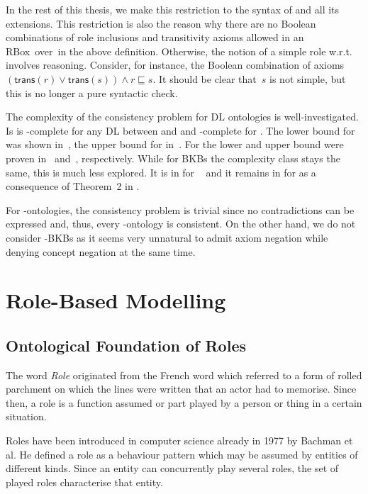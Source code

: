 In the rest of this thesis, we make this restriction to the syntax of \SHQ and all its
extensions.
%
This restriction is also the reason why there are no Boolean combinations of
role inclusions and transitivity axioms allowed in an RBox~\Rmc over~\Nsig in
the above definition.  Otherwise, the notion of a simple role w.r.t.~\Rmc
involves reasoning.  Consider, for instance, the Boolean combination of axioms
$(\mathsf{trans}(r)\lor\mathsf{trans}(s))\land r\sqsubseteq s$.  It should be
clear that~$s$ is not simple, but this is no longer a pure syntactic check.

The complexity of the consistency problem for DL ontologies is well-investigated. Is is
\ExpTime-complete for any DL between \ALC and \SHOQ and \NExpTime-complete for \SHOIQ. The lower
bound for \ALC was shown in~\cite{Sch-IJCAI91}, the upper bound for \SHOQ in~\cite{Tob-PhD01}. For
\SHOIQ the lower and upper bound were proven in~\cite{Tob-JAIR00} and~\cite{Tob-PhD01},
respectively. While for BKBs the complexity class stays the same, this is much less explored. It is
in \ExpTime for \SHOQ~\cite{Lip-PhD14} and it remains in \NExpTime for \SHOIQ as a consequence of
Theorem~2 in \cite{Pra-JLLI05}.

For \EL-ontologies, the consistency problem is trivial since no contradictions can be expressed and,
thus, every \EL-ontology is consistent. On the other hand, we do not consider \EL-BKBs as it seems
very unnatural to admit axiom negation while denying concept negation at the same time.


\section{Role-Based Modelling}
\label{sec:role-based-modelling}



\subsection{Ontological Foundation of Roles}
\label{sec:rosiroles}

The word \emph{Role} originated from the French word \emph{\Rosirole} which referred to a form of
rolled parchment on which the lines were written that an actor had to memorise.  Since then, a role is a
function assumed or part played by a person or thing in a certain situation.

Roles have been introduced in computer science already in 1977 by Bachman et al. He defined a role
as a behaviour pattern which may be assumed by entities of different kinds. Since an entity can
concurrently play several roles, the set of played roles characterise that entity.

